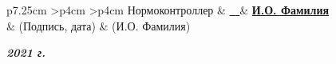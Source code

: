 \begin{titlepage}
\begin{table}[h!]
			\vspace{\baselineskip}

			\begin{signstabular}[0.7]{p{7.25cm} >{\centering\arraybackslash}p{4cm} >{\centering\arraybackslash}p{4cm}}
				Нормоконтроллер & \uline{\hfill \textbf{\ } \hfill} & \uline{\hfill \textbf{И.О. Фамилия} \hfill} \\
				& \scriptsize (Подпись, дата) & \scriptsize (И.О. Фамилия)
			\end{signstabular}
		\end{table}

		\begin{center}
			\normalsize \textit{\textbf{{2021} г.}}
		\end{center}
\end{titlepage}